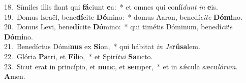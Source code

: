 {18.~}Símiles illis fiant qui \textbf{fá}ciunt \textbf{e}a:~* et omnes qui confí\textit{dunt} \textit{in} \textbf{e}is.\\
{19.~}Domus Israël, bene\textbf{dí}cite \textbf{Dó}mino:~* domus Aaron, benedí\textit{ci}\textit{te} \textbf{Dó}\textbf{mi}no.\\
{20.~}Domus Levi, bene\textbf{dí}cite \textbf{Dó}mino:~* qui timétis Dóminum, benedí\textit{ci}\textit{te} \textbf{Dó}\textbf{mi}no.\\
{21.~}Benedíctus Dómi\textbf{nus} ex \textbf{Si}on,~* qui hábitat \textit{in} \textit{Je}\textbf{rú}\textbf{sa}lem.\\
{22.~}Glória \textbf{Pa}tri, et \textbf{Fí}lio,~* et Spirí\textit{tu}\textit{i} \textbf{San}cto.\\
{23.~}Sicut erat in princípio, et \textbf{nunc}, et \textbf{sem}per,~* et in sǽcula sæcu\textit{ló}\textit{rum}. \textbf{A}men.\\
